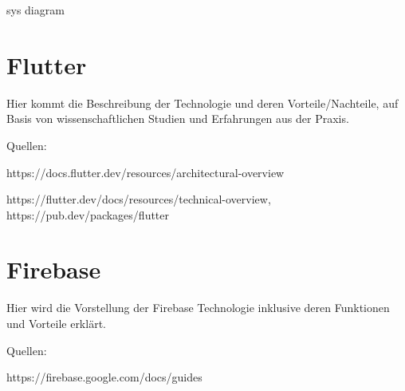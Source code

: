 


sys diagram

\section{Flutter}

Hier kommt die Beschreibung der Technologie und deren Vorteile/Nachteile, auf Basis von wissenschaftlichen Studien und Erfahrungen aus der Praxis.

Quellen: 

https://docs.flutter.dev/resources/architectural-overview

https://flutter.dev/docs/resources/technical-overview,
https://pub.dev/packages/flutter







\section{Firebase}

Hier wird die Vorstellung der Firebase Technologie inklusive deren Funktionen und Vorteile erklärt.

Quellen: 

https://firebase.google.com/docs/guides 

